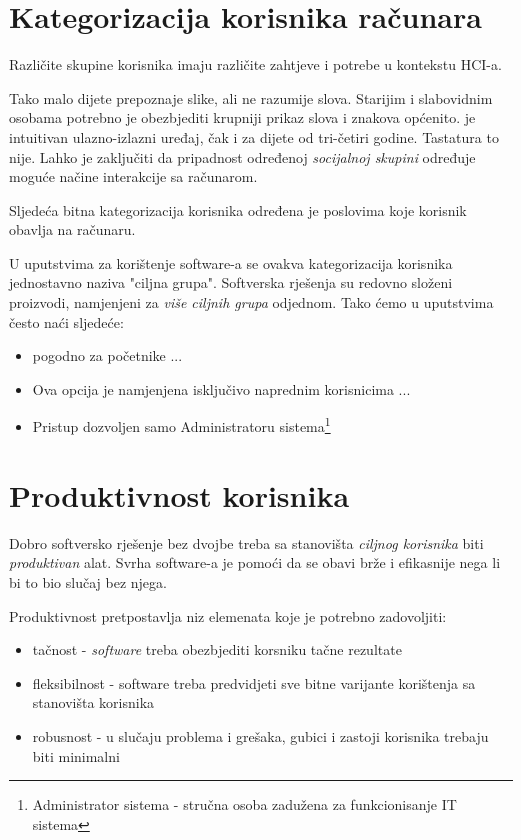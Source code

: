 \documentclass[times, utf8, seminar]{fit}
\begin{document}
\section{Kategorizacija korisnika računara}

Različite skupine korisnika imaju različite zahtjeve i potrebe u kontekstu HCI-a. 

Tako malo dijete prepoznaje slike, ali ne razumije slova. Starijim i slabovidnim osobama potrebno je obezbjediti krupniji prikaz slova i znakova općenito.  je intuitivan ulazno-izlazni uređaj, čak i za dijete od tri-četiri godine. Tastatura to nije. Lahko je zaključiti da pripadnost određenoj \emph{socijalnoj skupini} određuje moguće načine interakcije sa računarom.

Sljedeća bitna kategorizacija korisnika određena je poslovima koje korisnik obavlja na računaru. 

U uputstvima za korištenje software-a se ovakva kategorizacija korisnika jednostavno naziva "ciljna grupa". Softverska rješenja su redovno složeni proizvodi, namjenjeni za \emph{više ciljnih grupa} odjednom. Tako ćemo u uputstvima često naći sljedeće:
\begin{itemize}
  \item pogodno za početnike ...
  \item Ova opcija je namjenjena isključivo naprednim korisnicima ...
  \item Pristup dozvoljen samo Administratoru sistema\footnote{Administrator sistema - stručna osoba zadužena za funkcionisanje IT sistema}
\end{itemize}

\section{Produktivnost korisnika}

Dobro softversko rješenje bez dvojbe treba sa stanovišta \emph{ciljnog korisnika} biti \emph{produktivan} alat. Svrha software-a je pomoći da se obavi brže i efikasnije nega li bi to bio slučaj bez njega.

Produktivnost pretpostavlja niz elemenata koje je potrebno zadovoljiti:
\begin{itemize}
  \item tačnost - \emph{software} treba obezbjediti korsniku tačne rezultate
  \item fleksibilnost - software treba predvidjeti sve bitne varijante korištenja sa stanovišta korisnika
  \item robusnost - u slučaju problema i grešaka, gubici i zastoji korisnika trebaju biti minimalni
\end{itemize}
\end{document}
